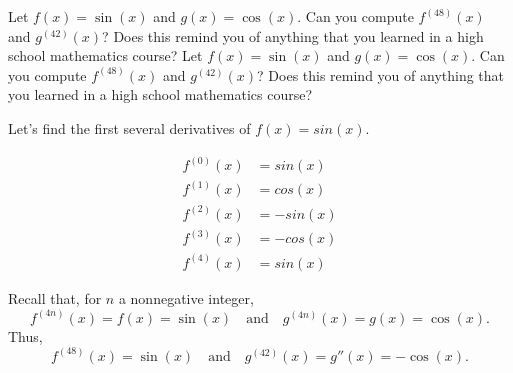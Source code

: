 \documentclass[nooutcomes]{ximera}
\begin{document}
\begin{problem}
Let $f(x) = \sin(x)$ and $g(x) = \cos(x)$.  Can you compute $f^{(48)}(x)$ and $g^{(42)}(x)$?  Does this remind you of anything that you learned in a high school mathematics course?  Let $f(x) = \sin(x)$ and $g(x) = \cos(x)$.
  Can you compute $f^{(48)}(x)$ and $g^{(42)}(x)$?
  Does this remind you of anything that you learned in a high school mathematics course?

\begin{freeResponse}
Let's find the first several derivatives of $f(x)=sin(x)$.

	\begin{align*}
	f^{(0)}(x)&=sin(x)\\
	f^{(1)}(x)&=cos(x)\\
	f^{(2)}(x)&=-sin(x)\\
	f^{(3)}(x)&=-cos(x)\\
	f^{(4)}(x)&=sin(x)
	\end{align*}

  Recall that, for $n$ a nonnegative integer,
  $$f^{(4n)}(x) = f(x) = \sin(x) \quad \text{and} \quad g^{(4n)}(x) = g(x) = \cos(x).$$
  Thus, 
  $$f^{(48)}(x) = \sin(x) \quad \text{and} \quad g^{(42)}(x) = g''(x) = - \cos(x).$$  



\end{freeResponse}

\end{problem}
	



	
	
			
			











\end{document}
